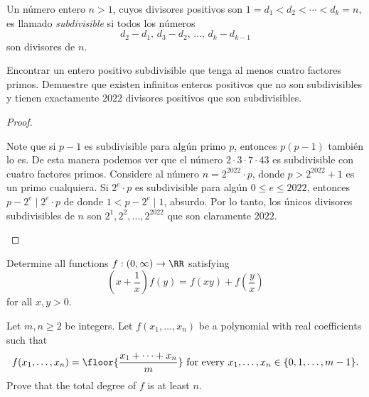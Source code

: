 \begin{probEG}
	Un número entero $n>1$, cuyos divisores positivos son $1=d_1<d_2<\cdots<d_k=n$, es llamado \emph{subdivisible} si todos los números
	\[d_2-d_1,\,d_3-d_2,\,\dots,\,d_k-d_{k-1}\]
	son divisores de $n$.
	\begin{enumerate}[(a)]
		\ii Encontrar un entero positivo subdivisible que tenga al menos cuatro factores primos.
		\ii Demuestre que existen infinitos enteros positivos que no son subdivisibles y tienen exactamente $2022$ divisores positivos que son subdivisibles.
	\end{enumerate}
\end{probEG}

\begin{proof}
	\begin{enumerate}[(a)]
		\ii Note que si $p-1$ es subdivisible para algún primo $p$, entonces $p(p-1)$ también lo es. De esta manera podemos ver que el número $2\cdot 3\cdot 7\cdot 43$ es subdivisible con cuatro factores primos.
		\ii Considere al número $n=2^{2022}\cdot p$, donde $p>2^{2022}+1$ es un primo cualquiera. Si $2^e\cdot p$ es subdivisible para algún $0\le e\le 2022$, entonces $p-2^e\mid 2^e\cdot p$ de donde $1<p-2^e\mid 1$, absurdo. Por lo tanto, los únicos divisores subdivisibles de $n$ son $2^1,2^2,\dots,2^{2022}$ que son claramente $2022$.
	\end{enumerate}
\end{proof}

\note[Álgebra]{}

\begin{probEG}[ISL 2018/A5]
	Determine all functions $f:(0,\infty)\to\RR$ satisfying
	\[\left(x+\frac1x\right)f(y)=f(xy)+f\left(\frac yx\right)\]
	for all $x,y>0$.
\end{probEG}

\begin{probHR}[ISL 2018/A6]
	Let $m,n\ge 2$ be integers. Let $f(x_1,\dots,x_n)$ be a polynomial with real coefficients such that
	\[f(x_1,\dots,x_n)=\floor{\frac{x_1+\dots+x_n}{m}}\text{ for every }x_1,\dots,x_n\in\{0,1,\dots,m-1\}.\]
	Prove that the total degree of $f$ is at least $n$.
\end{probHR}


